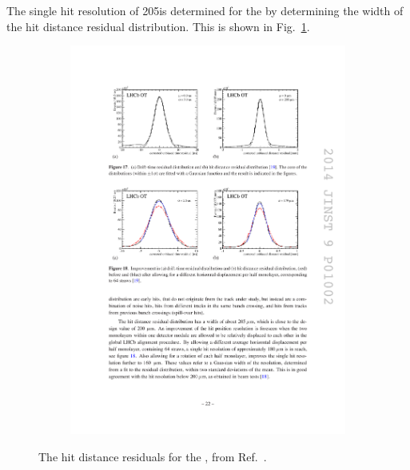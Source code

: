The single hit resolution of 205\mum is determined for the \ot by determining the width of the hit distance residual distribution. This is shown in Fig.~\ref{fig:Dec_ot_resolution}.



\begin{figure}[!h]
    \centering
    \begin{subfigure}[t]{0.4\textwidth}
        \centering
        \includegraphics[width=1.0\textwidth]{figs/Detector/ot_residuals.pdf}
    \end{subfigure}
    \caption{The hit distance residuals for the \ot, from Ref.~\cite{LHCb-DP-2013-003}.}
    \label{fig:Dec_ot_resolution}   
\end{figure}




